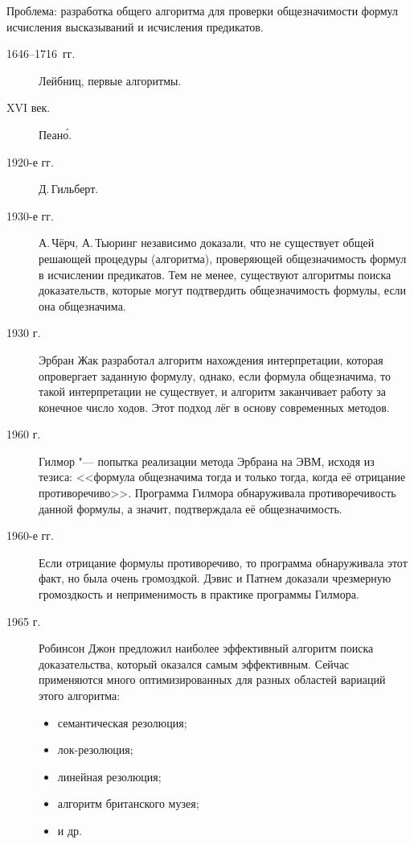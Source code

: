 Проблема: разработка общего алгоритма для проверки общезначимости
формул исчисления высказываний и исчисления предикатов.

\begin{description}
  \item[1646--1716~гг.] Лейбниц, первые алгоритмы.
  \item[XVI век.] Пеан\'{о}.
  \item[1920-е гг.] Д.\,Гильберт.
  \item[1930-е гг.] А.\,Чёрч, А.\,Тьюринг независимо доказали, что не
существует общей решающей процедуры (алгоритма), проверяющей
общезначимость формул в исчислении предикатов. Тем не менее,
существуют алгоритмы поиска доказательств, которые могут подтвердить
общезначимость формулы, если она общезначима.
  \item[1930 г.] Эрбран Жак разработал алгоритм нахождения
интерпретации, которая опровергает заданную формулу, однако, если
формула общезначима, то такой интерпретации не существует, и алгоритм
заканчивает работу за конечное число ходов. Этот подход лёг в основу
современных методов.
  \item[1960 г.] Гилмор "--- попытка реализации метода Эрбрана на ЭВМ,
исходя из тезиса: <<формула общезначима тогда и только тогда, когда её
отрицание противоречиво>>. Программа Гилмора обнаруживала
противоречивость данной формулы, а значит, подтверждала её
общезначимость.
  \item[1960-е гг.] Если отрицание формулы противоречиво, то программа
обнаруживала этот факт, но была очень громоздкой. Дэвис и Патнем
доказали чрезмерную громоздкость и неприменимость в практике программы
Гилмора.
  \item[1965 г.] Робинсон Джон предложил наиболее эффективный алгоритм
поиска доказательства, который оказался самым эффективным. Сейчас
применяются много оптимизированных для разных областей вариаций этого
алгоритма:
    \begin{itemize}
    \item семантическая резолюция;
    \item лок-резолюция;
    \item линейная резолюция;
    \item алгоритм британского музея;
    \item и др.
    \end{itemize}
\end{description}


